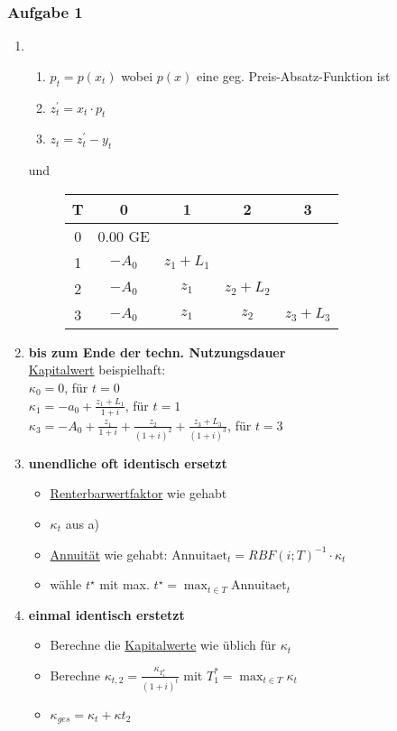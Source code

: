 	\subsubsection*{Aufgabe 1}
	\begin{enumerate}[label=\alph*)]
		\item \begin{enumerate}
				\item $p_t=p(x_t)$ wobei $p(x)$ eine geg. Preis-Absatz-Funktion ist
				\item $z_t^\prime=x_t\cdot p_t$
				\item $z_t=z_t^\prime-y_t$
			\end{enumerate} 
			und \\
			\begin{figure}[H]
				\centering
				\begin{tabular}{|c|c|c|c|c|}
					\hline
					\textbf{T}  & \textbf{0} & \textbf{1} & \textbf{2}  & \textbf{3}\\ \hline
					0          & 0.00 GE     &             &            &   \\
					1          & $-A_0$     & $z_1 + L_1$ &            &  \\			
					2          & $-A_0$     & $z_1$       & $z_2 + L_2$&  \\			
					3          & $-A_0$     & $z_1$       & $z_2$& $z_3+L_3$ \\
					\hline
				\end{tabular}
			\end{figure}
		\item \textbf{bis zum Ende der techn. Nutzungsdauer} \\ \hyperref[Kapitalwert]{Kapitalwert} beispielhaft:\\
		$\kappa_0=0$, für $t=0$\\
		$\kappa_1=-a_0 + \frac{z_1+L_1}{1+i}$, für $t=1$ \\ $\kappa_3=-A_0+\frac{z_1}{1+i}+\frac{z_2}{(1+i)^2}+\frac{z_3+L_3}{(1+i)^3}$, für $t=3$
		\item \textbf{unendliche oft identisch ersetzt}
			\begin{itemize}
				\item \hyperref[Rentenbarwertfaktor]{Renterbarwertfaktor} wie gehabt
				\item $\kappa_t$ aus a)
				\item \hyperref[Annuitaet]{Annuität} wie gehabt: $\text{Annuitaet}_t = RBF(i;T)^{-1}\cdot \kappa_t$
				\item wähle $t^\star$ mit max. $t^\star= \max_{t\in T} \text{Annuitaet}_t$
			\end{itemize}
		\item \textbf{einmal identisch erstetzt}
			\begin{itemize}
				\item Berechne die \hyperref[Kapitalwert]{Kapitalwerte} wie üblich für $\kappa_t$
				\item Berechne $\kappa_{t,2} = \frac{\kappa_{T_1^*}}{(1+i)^t}$ mit $T_1^* = \max_{t\in T} \kappa_t$
				\item $\kappa_{ges}=\kappa_t+\kappa{t_2}$
			\end{itemize}
	\end{enumerate}

